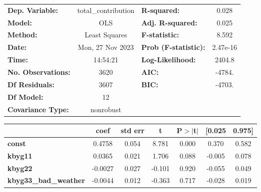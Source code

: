 \begin{center}
\begin{tabular}{lclc}
\toprule
\textbf{Dep. Variable:}                      & total\_contribution & \textbf{  R-squared:         } &     0.028   \\
\textbf{Model:}                              &         OLS         & \textbf{  Adj. R-squared:    } &     0.025   \\
\textbf{Method:}                             &    Least Squares    & \textbf{  F-statistic:       } &     8.592   \\
\textbf{Date:}                               &   Mon, 27 Nov 2023  & \textbf{  Prob (F-statistic):} &  2.47e-16   \\
\textbf{Time:}                               &       14:54:21      & \textbf{  Log-Likelihood:    } &    2404.8   \\
\textbf{No. Observations:}                   &          3620       & \textbf{  AIC:               } &    -4784.   \\
\textbf{Df Residuals:}                       &          3607       & \textbf{  BIC:               } &    -4703.   \\
\textbf{Df Model:}                           &            12       & \textbf{                     } &             \\
\textbf{Covariance Type:}                    &      nonrobust      & \textbf{                     } &             \\
\bottomrule
\end{tabular}
\begin{tabular}{lcccccc}
                                             & \textbf{coef} & \textbf{std err} & \textbf{t} & \textbf{P$> |$t$|$} & \textbf{[0.025} & \textbf{0.975]}  \\
\midrule
\textbf{const}                               &       0.4758  &        0.054     &     8.781  &         0.000        &        0.370    &        0.582     \\
\textbf{kbyg11}                              &       0.0365  &        0.021     &     1.706  &         0.088        &       -0.005    &        0.078     \\
\textbf{kbyg22}                              &      -0.0027  &        0.027     &    -0.101  &         0.920        &       -0.055    &        0.049     \\
\textbf{kbyg33\_bad\_weather}                &      -0.0044  &        0.012     &    -0.363  &         0.717        &       -0.028    &        0.019     \\

\end{tabular}
\end{center}

